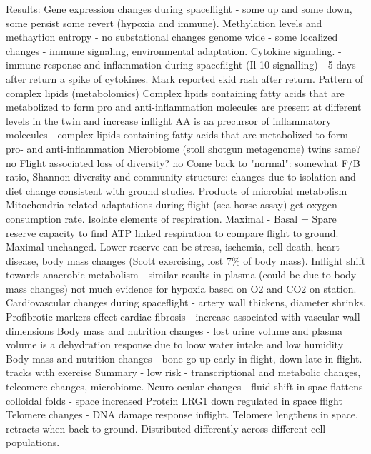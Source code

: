 \documentclass[a4paper, 11pt]{article}
\begin{document}
    Results: Gene expression changes during spaceflight - some up and some down, some persist some revert (hypoxia and immune). Methylation levels and methaytion entropy - no substational changes genome wide - some localized changes - immune signaling, environmental adaptation. 
    Cytokine signaling. - immune response and inflammation during spaceflight (Il-10 signalling)   - 5 days after return a spike of cytokines. Mark reported skid rash after return. 
    Pattern of complex lipids (metabolomics) Complex lipids containing fatty acids that are metabolized to form pro and anti-inflammation molecules are present at different levels in the twin and increase inflight 
    AA is aa precursor of inflammatory molecules - complex lipids containing fatty acids that are metabolized to form pro- and anti-inflammation
    Microbiome (stoll shotgun metagenome) twins same? no Flight associated loss of diversity? no Come back to "normal": somewhat 
    F/B ratio, Shannon diversity and community structure: changes due to isolation and diet change consistent with ground studies. 
    Products of microbial metabolism 
    Mitochondria-related adaptations during flight (sea horse assay) get oxygen consumption rate. Isolate elements of respiration. Maximal - Basal = Spare reserve capacity to find ATP linked respiration  to compare flight to ground.  Maximal unchanged. Lower reserve can be stress, ischemia, cell death, heart disease, body mass changes (Scott exercising, lost 7\% of body mass). 
    Inflight shift towards anaerobic metabolism - similar results in plasma (could be due to body mass changes) not much evidence for hypoxia based on O2 and CO2 on station. 
    Cardiovascular changes during spaceflight - artery wall thickens, diameter shrinks. Profibrotic markers effect cardiac fibrosis - increase associated with vascular wall dimensions
    Body mass and nutrition changes - lost urine volume and plasma volume is a dehydration response due to loow water intake and low humidity
    Body mass and nutrition changes - bone go up early in flight, down late in flight. tracks with exercise
    Summary - low risk - transcriptional and metabolic changes, teleomere changes, microbiome. 
    Neuro-ocular changes - fluid shift in spae flattens colloidal folds - space increased Protein LRG1 down regulated in space flight 
    Telomere changes - DNA damage response inflight. Telomere lengthens in space, retracts when back to ground. Distributed differently across different cell populations. 
    
   
   
\end{document}

